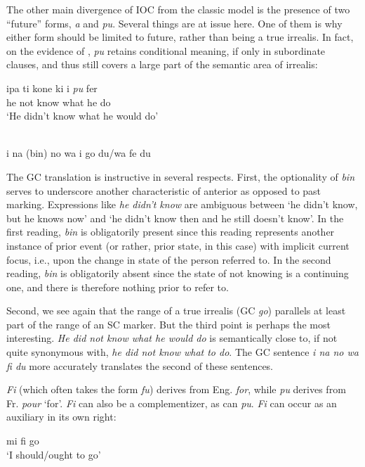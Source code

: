 The other main divergence of IOC from the classic model is the presence of two ``future'' forms, \textit{a} and \textit{pu}. Several things are at issue here. One of them is why either form should be limited to future, rather than being a true irrealis. In fact, on the evidence of \citet[103]{Corne1977}, \textit{pu} retains conditional meaning, if only in subordinate clauses, and thus still covers a large part of the semantic area of ir\-realis:

\ea\label{ex:2:118}
\gll ipa ti kone ki i \emph{pu} fer\\
he not {\TNS} know what he {\MOD} do \\
\glt `He didn't know what he would do'
\z

\ea\label{ex:2:119}
\ili{\langGC}{}{}\\
i na (bin) no wa i go du/wa fe du
\z

The GC translation is instructive in several respects. First, the optionality of \textit{bin} serves to underscore another characteristic of ante\-rior as opposed to past marking. Expressions like \textit{he didn't know} are ambiguous between `he didn't know, but he knows now' and `he didn't know then and he still doesn't know'. In the first reading, \textit{bin} is obli\-gatorily present since this reading represents another instance of prior event (or rather, prior state, in this case) with implicit current focus, i.e., upon the change in state of the person referred to. In the second reading, \textit{bin} is obligatorily absent since the state of not knowing is a continuing one, and there is therefore nothing prior to refer to.

Second, we see again that the range of a true irrealis (GC \textit{go}) parallels at least part of the range of an SC marker. But the third point is perhaps the most interesting. \textit{He did not know what he would do} is semantically close to, if not quite synonymous with, \textit{he did not know what to do}. The GC sentence \textit{i na no wa fi du} more accurately translates the second of these sentences.

\textit{Fi} (which often takes the form \textit{fu}) derives from Eng. \textit{for}, while \textit{pu} derives from Fr. \textit{pour} `for'. \textit{Fi} can also be a complementizer, as can \textit{pu}. \textit{Fi} can occur as an auxiliary in its own right:

\ea\label{ex:2:120}
mi fi go\\
\glt `I should/ought to go'
\z

